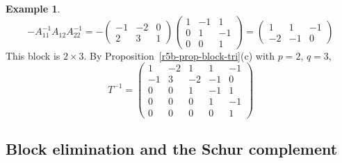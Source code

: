 \documentclass[12pt]{article}
\theoremstyle{definition}
\newtheorem{example}[theorem]{Example}
\begin{document}
\begin{example}
\[\]
\[
-A_{11}^{-1}A_{12}A_{22}^{-1}=-\begin{pmatrix}-1&-2&0\\2&3&1\end{pmatrix}\begin{pmatrix}1&-1&1\\0&1&-1\\0&0&1\end{pmatrix}
=\begin{pmatrix}1&1&-1\\-2&-1&0\end{pmatrix}
\]
This block is \(2\times3\). By Proposition~\ref{r5b-prop-block-tri}(c) with \(p=2\), \(q=3\),
\[
T^{-1}=\left(\begin{array}{cc|ccc}1&-2&1&1&-1\\-1&3&-2&-1&0\\\hline0&0&1&-1&1\\0&0&0&1&-1\\0&0&0&0&1\end{array}\right)
\]
\end{example}

\subsection*{Block elimination and the Schur complement}
\end{document}
